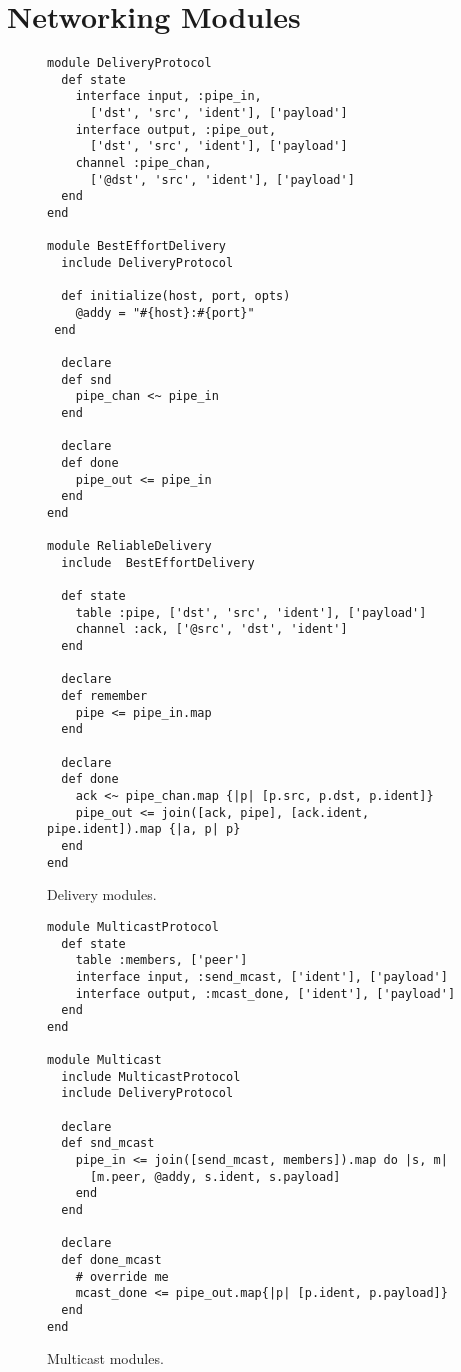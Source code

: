 \section{Networking Modules}

\begin{figure}[t]
\begin{scriptsize}
\begin{lstlisting}
module DeliveryProtocol
  def state
    interface input, :pipe_in,
      ['dst', 'src', 'ident'], ['payload']
    interface output, :pipe_out,
      ['dst', 'src', 'ident'], ['payload']
    channel :pipe_chan,
      ['@dst', 'src', 'ident'], ['payload']
  end
end

module BestEffortDelivery
  include DeliveryProtocol

  def initialize(host, port, opts)
    @addy = "#{host}:#{port}"
 end

  declare
  def snd
    pipe_chan <~ pipe_in
  end

  declare
  def done
    pipe_out <= pipe_in
  end
end

module ReliableDelivery
  include  BestEffortDelivery

  def state
    table :pipe, ['dst', 'src', 'ident'], ['payload']
    channel :ack, ['@src', 'dst', 'ident']
  end

  declare
  def remember
    pipe <= pipe_in.map
  end

  declare
  def done
    ack <~ pipe_chan.map {|p| [p.src, p.dst, p.ident]}
    pipe_out <= join([ack, pipe], [ack.ident, pipe.ident]).map {|a, p| p}
  end
end
\end{lstlisting}
\centering
\vspace{-10pt}
\caption{Delivery modules.}
\label{fig:delivery-impl}
\end{scriptsize}
\vspace{-2pt}
\end{figure}


\begin{figure}[t]
\begin{scriptsize}
\begin{lstlisting}
module MulticastProtocol
  def state
    table :members, ['peer']
    interface input, :send_mcast, ['ident'], ['payload']
    interface output, :mcast_done, ['ident'], ['payload']
  end
end

module Multicast
  include MulticastProtocol
  include DeliveryProtocol

  declare
  def snd_mcast
    pipe_in <= join([send_mcast, members]).map do |s, m|
      [m.peer, @addy, s.ident, s.payload]
    end
  end

  declare
  def done_mcast
    # override me
    mcast_done <= pipe_out.map{|p| [p.ident, p.payload]}
  end
end
\end{lstlisting}
\centering
\vspace{-10pt}
\caption{Multicast modules.}
\label{fig:multicast-impl}
\end{scriptsize}
\vspace{-2pt}
\end{figure}
